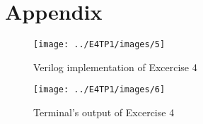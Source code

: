 \newpage
{}
\section{Appendix}

\begin{figure}[h!] %
\begin{centering}
\texttt{[image: ../E4TP1/images/5]}
\par\end{centering}
\caption{\color{cyan}Verilog implementation of Excercise 4}
\label{fig:figura4.6}
\end{figure}

\begin{figure}[h!]%
\begin{centering}
\texttt{[image: ../E4TP1/images/6]}
\par\end{centering}
\caption{\color{cyan}Terminal's output of Excercise 4}
\label{fig:figura4.7}
\end{figure}